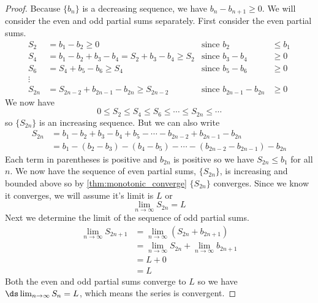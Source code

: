 \begin{proof}
Because $\{b_n\}$ is a decreasing sequence, we have $b_n-b_{n+1}\geq 0$. 
We will consider the even and odd partial sums separately. First consider the even partial sums.
\begin{align*}
S_2&=b_1-b_2\geq 0  &\text{since } b_2&\leq b_1\\
S_4&=b_1-b_2+b_3-b_4=S_2+b_3-b_4\geq S_2 &\text{since } b_3- b_4&\geq 0\\
S_6&=S_4+b_5-b_6\geq S_4 &\text{since } b_5- b_6&\geq 0\\
\vdots \\
S_{2n}&=S_{2n-2}+b_{2n-1}-b_{2n}\geq S_{2n-2}  &\text{since } b_{2n-1}- b_{2n}&\geq 0
\end{align*}
We now have
\[0\leq S_2\leq S_4\leq S_6\leq  \dotsb \leq S_{2n}\leq \dotsb\]
so $\{S_{2n}\}$ is an increasing sequence. 
But we can also write 
\begin{align*}
S_{2n}&=b_1-b_2+b_3-b_4+b_5-\dotsb -b_{2n-2}+b_{2n-1}-b_{2n}\\
&=b_1-(b_2-b_3)-(b_4-b_5)-\dotsb -(b_{2n-2}-b_{2n-1})-b_{2n}
\end{align*}
Each term in parentheses is positive and $b_{2n}$ is positive so we have $S_{2n}\leq b_1$ for all $n$. We now have the sequence of even partial sums, $\{S_{2n}\}$, is increasing and bounded above so by \autoref{thm:monotonic_converge}
 $\{S_{2n}\}$ converges. Since we know it converges, we will assume it's limit is $L$ or
\[\lim_{n\to \infty}S_{2n}=L\]
Next we determine the limit of the sequence of odd partial sums.
\begin{align*}
\lim_{n\to \infty}S_{2n+1}&=\lim_{n\to \infty}(S_{2n}+b_{2n+1})\\
&=\lim_{n\to \infty}S_{2n}+\lim_{n\to \infty}b_{2n+1}\\
&=L+0\\
&=L
\end{align*}
Both the even and odd partial sums converge to $L$ so we have $\ds \lim_{n\to \infty}S_n=L$, which means the series is convergent.
\end{proof}


